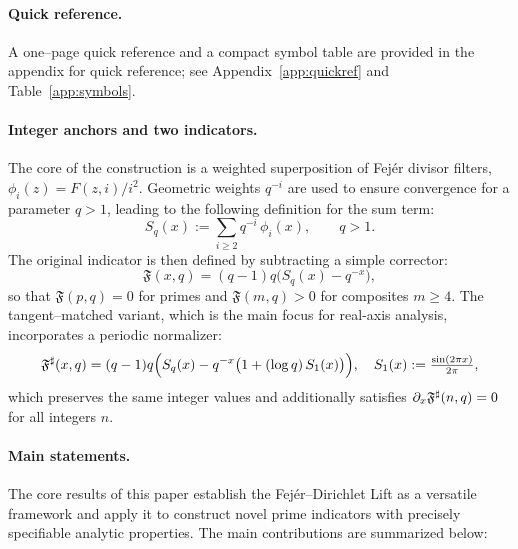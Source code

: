 \paragraph*{Quick reference.}
A one–page quick reference and a compact symbol table are provided in the appendix for quick reference; see Appendix~\ref{app:quickref} and Table~\ref{app:symbols}.

\paragraph{Integer anchors and two indicators.}
The core of the construction is a weighted superposition of Fej\'er divisor filters, $\phi_i(z)=F(z,i)/i^{2}$. Geometric weights $q^{-i}$ are used to ensure convergence for a parameter $q>1$, leading to the following definition for the sum term:
\[
S_q(x):=\sum_{i\ge2} q^{-i}\,\phi_i(x),\qquad q>1.
\]
The original indicator is then defined by subtracting a simple corrector:
\[
\mathfrak F(x,q)=(q-1)q\Big(S_q(x)-q^{-x}\Big),
\]
so that $\mathfrak F(p,q)=0$ for primes and $\mathfrak F(m,q)>0$ for composites $m\ge4$.
The tangent–matched variant, which is the main focus for real-axis analysis, incorporates a periodic normalizer:
\[
\mathfrak F^{\sharp}(x,q)=(q-1)q\Big(S_q(x)-q^{-x}\big(1+(\log q)\,S_1(x)\big)\Big),
\quad S_1(x):=\tfrac{\sin(2\pi x)}{2\pi},
\]
which preserves the same integer values and additionally satisfies $\partial_x\mathfrak F^{\sharp}(n,q)=0$ for all integers $n$.

\paragraph{Main statements.}
The core results of this paper establish the Fejér–Dirichlet Lift as a versatile framework and apply it to construct novel prime indicators with precisely specifiable analytic properties. The main contributions are summarized below:

